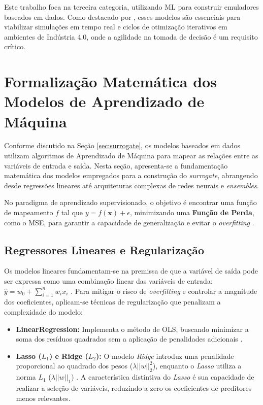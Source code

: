 Este trabalho foca na terceira categoria, utilizando \gls{ML} para construir emuladores baseados em dados. Como destacado por , esses modelos são essenciais para viabilizar simulações em tempo real e ciclos de otimização iterativos em ambientes de Indústria 4.0, onde a agilidade na tomada de decisão é um requisito crítico.

\section{Formalização Matemática dos Modelos de Aprendizado de Máquina}
\label{sec:matematica_modelos}

Conforme discutido na Seção \ref{sec:surrogate}, os modelos baseados em dados utilizam algoritmos de Aprendizado de Máquina para mapear as relações entre as variáveis de entrada e saída. Nesta seção, apresenta-se a fundamentação matemática dos modelos empregados para a construção do \textit{surrogate}, abrangendo desde regressões lineares até arquiteturas complexas de redes neurais e \textit{ensembles}.

No paradigma de aprendizado supervisionado, o objetivo é encontrar uma função de mapeamento $f$ tal que $y = f(\mathbf{x}) + \epsilon$, minimizando uma \textbf{Função de Perda}, como o \gls{MSE}, para garantir a capacidade de generalização e evitar o \textit{overfitting} \cite{Asnicar_2024_MachineLearning, monard2003conceitos}.

\subsection{Regressores Lineares e Regularização}

Os modelos lineares fundamentam-se na premissa de que a variável de saída pode ser expressa como uma combinação linear das variáveis de entrada: $\hat{y} = w_0 + \sum_{i=1}^{n} w_i x_i$ \cite{James_2013_ISLR}. Para mitigar o risco de \textit{overfitting} e controlar a magnitude dos coeficientes, aplicam-se técnicas de regularização que penalizam a complexidade do modelo:

\begin{itemize}
    \item \textbf{LinearRegression:} Implementa o método de \gls{OLS}, buscando minimizar a soma dos resíduos quadrados sem a aplicação de penalidades adicionais \cite{James_2013_ISLR}.
    \item \textbf{Lasso ($L_1$) e Ridge ($L_2$):} O modelo \textit{Ridge} introduz uma penalidade proporcional ao quadrado dos pesos ($\lambda ||w||^2_2$), enquanto o \textit{Lasso} utiliza a norma $L_1$ ($\lambda ||w||_1$) \cite{James_2013_ISLR}. A característica distintiva do \textit{Lasso} é sua capacidade de realizar a seleção de variáveis, reduzindo a zero os coeficientes de preditores menos relevantes.
\end{itemize}

